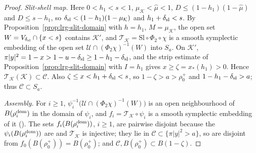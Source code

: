 \begin{proof}
\emph{Slit-shell map.} Here $0<h_1<s<1$, $\mu_{\mathcal K}<\hat\mu<1$, $D\le(1-h_1)(1-\hat\mu)$ and $D\le s-h_1$, so
$\delta_{\rm sl}<(1-h_1)(1-\mu_{\mathcal K})$ and $h_1+\delta_{\rm sl}<s$. By Proposition~\ref{prop:lrg-slit-domain} with
$h=h_1$, $M=\mu_{\mathcal K}$, the open set $W=V_{\delta_{\rm sl}}\cap\{x<s\}$ contains $\mathcal K'$, and
$\mathcal T_{\mathcal K}=\mathrm{Sl}\circ\Phi_2\circ\chi$ is a smooth symplectic embedding of the open set
$\mathcal U\cap(\Phi_2\chi)^{-1}(W)$ into $S_a$. On $\mathcal K'$, $\pi|y|^2=1-x>1-u-\delta_{\rm sl}\ge1-h_1-\delta_{\rm sl}$, and the
strip estimate of Proposition~\ref{prop:lrg-slit-domain} with $I=h_1$ gives $x\ge\zeta=x_*(h_1)>0$. Hence
$\mathcal T_{\mathcal K}(\mathcal K)\subset\mathcal C$. Also $\zeta\le x<h_1+\delta_{\rm sl}<s$, so $1-\zeta>a>\rho_0^+$ and
$1-h_1-\delta_{\rm sl}>a$; thus $\mathcal C\subset S_a$.

\emph{Assembly.} For $i\ge1$, $\psi_i^{-1}\bigl(\mathcal U\cap(\Phi_2\chi)^{-1}(W)\bigr)$ is an open neighbourhood of
$B(\rho_i^{\rm dom})$ in the domain of $\psi_i$, and $f_i=\mathcal T_{\mathcal K}\circ\psi_i$ is a smooth symplectic embedding of it
(). The sets $f_i(B(\rho_i^{\rm dom}))$, $i\ge1$, are pairwise disjoint because the
$\psi_i(B(\rho_i^{\rm dom}))$ are and $\mathcal T_{\mathcal K}$ is injective; they lie in $\mathcal C\subset\{\pi|y|^2>a\}$, so are
disjoint from $f_0(B(\rho_0^+))=B(\rho_0^+)$; and $\mathcal C,B(\rho_0^+)\subset B(1-\zeta)$.
\end{proof}
